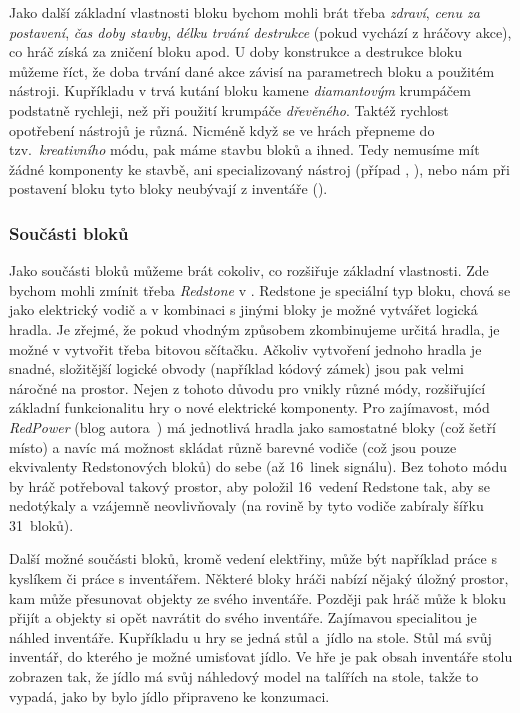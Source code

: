 Jako další základní vlastnosti bloku bychom mohli brát třeba \textit{zdraví}, \textit{cenu za postavení}, \textit{čas doby stavby}, \textit{délku trvání destrukce} (pokud vychází z hráčovy akce), co hráč získá za zničení bloku apod. U doby konstrukce a destrukce bloku můžeme říct, že doba trvání dané akce závisí na parametrech bloku a použitém nástroji. Kupříkladu v  trvá kutání bloku kamene \textit{diamantovým} krumpáčem podstatně rychleji, než při použití krumpáče \textit{dřevěného}. Taktéž rychlost opotřebení nástrojů je různá. Nicméně když se ve hrách přepneme do tzv.~\textit{kreativního} módu, pak máme stavbu bloků  a ihned. Tedy nemusíme mít žádné komponenty ke stavbě, ani specializovaný nástroj (případ \SE{}, \ME{}), nebo nám při postavení bloku tyto bloky neubývají z inventáře (\MC{}). 

\subsubsection{Součásti bloků}
Jako součásti bloků můžeme brát cokoliv, co rozšiřuje základní vlastnosti. Zde bychom mohli zmínit třeba \textit{Redstone} v . Redstone je speciální typ bloku, chová se jako elektrický vodič a v kombinaci s jinými bloky je možné vytvářet logická hradla. Je zřejmé, že pokud vhodným způsobem zkombinujeme určitá hradla, je možné v  vytvořit třeba bitovou sčítačku. Ačkoliv vytvoření jednoho hradla je snadné, složitější logické obvody (například kódový zámek) jsou pak velmi náročné na prostor. Nejen z tohoto důvodu pro \MC{} vnikly různé módy, rozšiřující základní funkcionalitu hry o nové elektrické komponenty. Pro zajímavost, mód \textit{RedPower} (blog autora~\citep{eloraam}) má jednotlivá hradla jako samostatné bloky (což šetří místo) a navíc má možnost skládat různě barevné vodiče (což jsou pouze ekvivalenty Redstonových bloků) do sebe (až 16~linek signálu). Bez tohoto módu by hráč potřeboval takový prostor, aby položil 16~vedení Redstone tak, aby se nedotýkaly a vzájemně neovlivňovaly (na rovině by tyto vodiče zabíraly šířku 31~bloků). 

Další možné součásti bloků, kromě vedení elektřiny, může být například práce s kyslíkem či práce s inventářem. Některé bloky hráči nabízí nějaký úložný prostor, kam může přesunovat objekty ze svého inventáře. Později pak hráč může k bloku přijít a objekty si opět navrátit do svého inventáře. Zajímavou specialitou je náhled inventáře. Kupříkladu u hry \ME{} se jedná stůl a~jídlo na stole. Stůl má svůj inventář, do kterého je možné umisťovat jídlo. Ve hře je pak obsah inventáře stolu zobrazen tak, že jídlo má svůj náhledový model na talířích na stole, takže to vypadá, jako by bylo jídlo připraveno ke konzumaci. 


